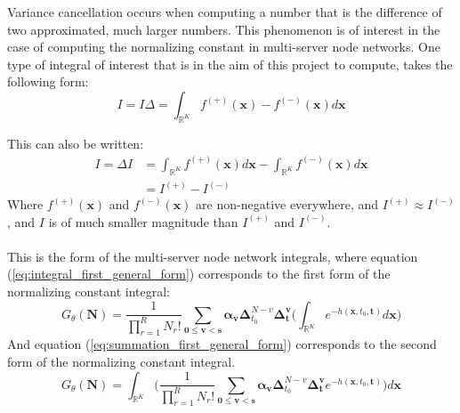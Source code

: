 Variance cancellation occurs when computing a number that is the difference of two approximated, much larger numbers. This phenomenon is of interest in the case of computing the normalizing constant in multi-server node networks. One type of integral of interest that is in the aim of this project to compute, takes the following form:
\begin{equation} \label{eq:summation_first_general_form}
    I = I \Delta = \int_{\mathbb{R}^K} f^{(+)}(\mathbf{x}) - f^{(-)}(\mathbf{x}) d \mathbf{x}
\end{equation}

This can also be written:
\begin{equation} \label{eq:integral_first_general_form}
\begin{split}
    I = \Delta I & = \int_{\mathbb{R}^K} f^{(+)}(\mathbf{x}) d \mathbf{x} - \int_{\mathbb{R}^K} f^{(-)}(\mathbf{x}) d \mathbf{x}\\
    & = I^{(+)} - I^{(-)}
\end{split}
\end{equation}
Where \(f^{(+)}(\mathbf{x})\) and \(f^{(-)}(\mathbf{x})\) are non-negative everywhere, and \(I^{(+)} \approx I^{(-)}\), and \(I\) is of much smaller magnitude than \(I^{(+)}\) and \(I^{(-)}\).
\\\\
This is the form of the multi-server node network integrals, where equation (\ref{eq:integral_first_general_form}) corresponds to the first form of the normalizing constant integral:
\[
G_\theta(\mathbf{N}) = \frac{1}{\prod_{r=1}^R N_r!} \sum_{\mathbf{0 \leq v <s}} \mathbf{\alpha_v} \boldsymbol{\Delta}_{t_0}^{N-v} \boldsymbol{\Delta}_{\mathbf{t}}^{\mathbf{v}} \bigg( \int_{\mathbb{R}^K} e^{-h(\mathbf x, t_0, \mathbf{t})} d \mathbf{x} \bigg)
\]
And equation (\ref{eq:summation_first_general_form}) corresponds to the second form of the normalizing constant integral.
\begin{equation}\label{eq:summation_first_NC_form}
    G_\theta(\mathbf{N}) = \int_{\mathbb{R}^K} \bigg( \frac{1}{\prod_{r=1}^R N_r!} \sum_{\mathbf{0 \leq v <s}} \mathbf{\alpha_v} \boldsymbol{\Delta}_{t_0}^{N-v} \boldsymbol{\Delta}_{\mathbf{t}}^{\mathbf{v}} e^{-h(\mathbf x, t_0, \mathbf{t})}  \bigg) d \mathbf{x}
\end{equation}

